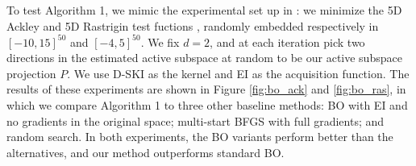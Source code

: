 To test Algorithm 1, we mimic the experimental set up in 
\cite{wang2013bayesian}: we minimize the 5D Ackley and 5D Rastrigin test
fuctions \cite{sfutest2013}, randomly embedded respectively in $[-10, 15]^{50}$
and $[-4, 5]^{50}$. We fix $d=2$, and at each iteration pick two directions in
the estimated active subspace at random to be our active subspace projection
$P$. We use D-SKI as the kernel and EI as the acquisition function. The results
of these experiments are shown in Figure \ref{fig:bo_ack} and \cref{fig:bo_ras},
in which we compare Algorithm 1 to three other baseline methods: BO with EI and
no gradients in the original space; multi-start BFGS with full gradients; and
random search. In both experiments, the BO variants perform better than the
alternatives, and our method outperforms standard BO.